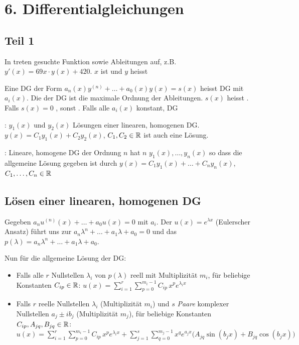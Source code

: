 \section{6. Differentialgleichungen}

\subsection{Teil 1}

\Def In  treten gesuchte Funktion sowie Ableitungen auf,
z.B. $y'(x) = 69x \cdot y(x) + 420$. $x$ ist  und $y$ heisst

\Def Eine DG der Form
$a_n(x)y^{(n)} + \ldots + a_0(x)y(x) = s(x)$
heisst  DG mit  $a_i(x)$. Die  der DG ist
die maximale Ordnung der Ableitungen. $s(x)$ heisst . Falls $s(x) = 0$
, sonst .
Falls alle $a_i(x)$ konstant, DG 

\Satz {}: $y_1(x)$ und $y_2(x)$ Lösungen einer linearen, homogenen DG.
$y(x) = C_1 y_1(x) + C_2 y_2(x)$, $C_1, C_2 \in \mathbb{R}$ ist auch eine Lösung.

\Satz {}: Lineare, homogene DG der Ordnung $n$ hat $n$
 $y_1(x), \ldots, y_n(x)$ so dass die allgemeine Lösung gegeben ist durch
$y(x) = C_1 y_1(x) + \ldots + C_n y_n(x)$, $C_1, \ldots, C_n \in \mathbb{R}$

\subsection{Lösen einer linearen, homogenen DG}

Gegeben $a_n u^{(n)}(x) + \ldots + a_0 u(x) = 0$ mit  $a_i$. Der  $u(x) = e^{\lambda x}$
(Eulerscher Ansatz) führt uns zur 
$a_n \lambda^n + \ldots + a_1 \lambda + a_0 = 0$ und das 
$p(\lambda) = a_n \lambda^n + \ldots + a_1 \lambda + a_0$.

Nun für die allgemeine Lösung der DG:
\vspace{-0.6em}
\begin{itemize}
    \item Falls alle $r$ Nullstellen $\lambda_i$ von $p(\lambda)$ reell mit Multiplizität $m_i$, für
    beliebige Konstanten $C_{ip} \in \mathbb{R}$:
    $u(x) = \sum_{i=1}^{r} \sum_{p=0}^{m_i-1} C_{ip} \, x^p e^{\lambda_i x}$
    \item Falls $r$ reelle Nullstellen $\lambda_i$ (Multiplizität $m_i$) und $s$ \textit{Paare}
    komplexer Nullstellen $a_j \pm ib_j$ (Multiplizität $m_j$), für beliebige Konstanten
    $C_{ip}, A_{jq}, B_{jq} \in \mathbb{R}$:
    $u(x) = \sum_{i=1}^{r} \sum_{p=0}^{m_i-1} C_{ip} \, x^p e^{\lambda_i x} + \sum_{j=1}^{s} \sum_{q=0}^{m_j-1} x^q e^{a_j x} \big(A_{jq} \sin(b_j x) + B_{jq} \cos(b_j x)\big)$
\end{itemize}

